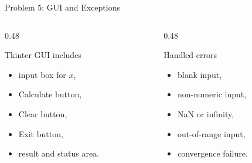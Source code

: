 \documentclass[aspectratio=169,11pt]{beamer}
\begin{document}
\begin{frame}{Problem 5: GUI and Exceptions}
\begin{columns}[T]
\begin{column}{0.48\textwidth}
\begin{block}{Tkinter GUI includes}
\begin{itemize}
    \item input box for $x$,
    \item Calculate button,
    \item Clear button,
    \item Exit button,
    \item result and status area.
\end{itemize}
\end{block}
\end{column}
\begin{column}{0.48\textwidth}
\begin{block}{Handled errors}
\begin{itemize}
    \item blank input,
    \item non-numeric input,
    \item NaN or infinity,
    \item out-of-range input,
    \item convergence failure.
\end{itemize}
\end{block}
\end{column}
\end{columns}
\end{frame}

\end{document}
